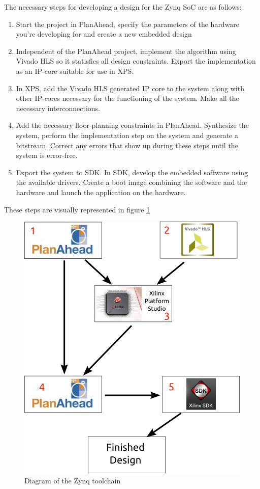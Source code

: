 The necessary steps for developing a design for the Zynq SoC are as follows:

\begin{enumerate}
	\item Start the project in PlanAhead, specify the parameters of the hardware you're developing for and create a new embedded design
	\item Independent of the PlanAhead project, implement the algorithm using Vivado HLS so it statisfies all design constraints. Export the implementation as an IP-core suitable for use in XPS.
	\item In XPS, add the Vivado HLS generated IP core to the system along with other IP-cores necessary for the functioning of the system. Make all the necessary interconnections.
	\item Add the necessary floor-planning constraints in PlanAhead. Synthesize the system, perform the implementation step on the system and generate a bitstream. Correct any errors that show up during these steps until the system is error-free.
	\item Export the system to SDK. In SDK, develop the embedded software using the available drivers. Create a boot image combining the software and the hardware and launch the application on the hardware.
\end{enumerate}
These steps are visually represented in figure \ref{img:toolchain_diagram}

\begin{figure}[H]
\centering
\includegraphics[scale=0.7]{./images/toolchain_diagram/toolchain_diagram.png}
\caption{Diagram of the Zynq toolchain}
\label{img:toolchain_diagram}
\end{figure}


